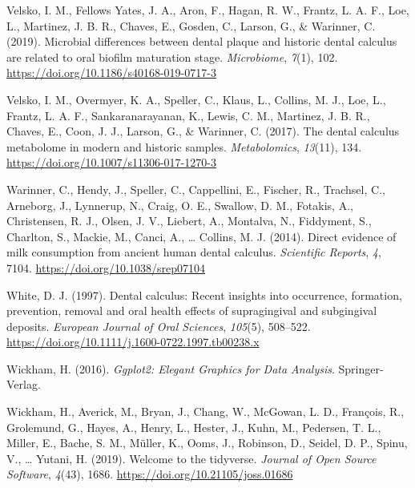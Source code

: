 \documentclass[
  b5paper,
]{book}
\newlength{\cslhangindent}
\newlength{\cslentryspacingunit} %
\newenvironment{CSLReferences}[2] %
 {%
  \setlength{\parindent}{0pt}
  \ifodd #1
  \let\oldpar\par
  \def\par{\hangindent=\cslhangindent\oldpar}
  \fi
  \setlength{\parskip}{#2\cslentryspacingunit}
 }%
 {}
\begin{document}
\begin{CSLReferences}{1}{0}
\leavevmode{}%
Velsko, I. M., Fellows Yates, J. A., Aron, F., Hagan, R. W., Frantz, L.
A. F., Loe, L., Martinez, J. B. R., Chaves, E., Gosden, C., Larson, G.,
\& Warinner, C. (2019). Microbial differences between dental plaque and
historic dental calculus are related to oral biofilm maturation stage.
\emph{Microbiome}, \emph{7}(1), 102.
\url{https://doi.org/10.1186/s40168-019-0717-3}

\leavevmode{}%
Velsko, I. M., Overmyer, K. A., Speller, C., Klaus, L., Collins, M. J.,
Loe, L., Frantz, L. A. F., Sankaranarayanan, K., Lewis, C. M., Martinez,
J. B. R., Chaves, E., Coon, J. J., Larson, G., \& Warinner, C. (2017).
The dental calculus metabolome in modern and historic samples.
\emph{Metabolomics}, \emph{13}(11), 134.
\url{https://doi.org/10.1007/s11306-017-1270-3}

\leavevmode{}%
Warinner, C., Hendy, J., Speller, C., Cappellini, E., Fischer, R.,
Trachsel, C., Arneborg, J., Lynnerup, N., Craig, O. E., Swallow, D. M.,
Fotakis, A., Christensen, R. J., Olsen, J. V., Liebert, A., Montalva,
N., Fiddyment, S., Charlton, S., Mackie, M., Canci, A., \ldots{}
Collins, M. J. (2014). Direct evidence of milk consumption from ancient
human dental calculus. \emph{Scientific Reports}, \emph{4}, 7104.
\url{https://doi.org/10.1038/srep07104}

\leavevmode{}%
White, D. J. (1997). Dental calculus: Recent insights into occurrence,
formation, prevention, removal and oral health effects of supragingival
and subgingival deposits. \emph{European Journal of Oral Sciences},
\emph{105}(5), 508--522.
\url{https://doi.org/10.1111/j.1600-0722.1997.tb00238.x}

\leavevmode{}%
Wickham, H. (2016). \emph{Ggplot2: {Elegant Graphics} for {Data
Analysis}}. {Springer-Verlag}.

\leavevmode{}%
Wickham, H., Averick, M., Bryan, J., Chang, W., McGowan, L. D.,
François, R., Grolemund, G., Hayes, A., Henry, L., Hester, J., Kuhn, M.,
Pedersen, T. L., Miller, E., Bache, S. M., Müller, K., Ooms, J.,
Robinson, D., Seidel, D. P., Spinu, V., \ldots{} Yutani, H. (2019).
Welcome to the {tidyverse}. \emph{Journal of Open Source Software},
\emph{4}(43), 1686. \url{https://doi.org/10.21105/joss.01686}


\end{CSLReferences}
\end{document}
